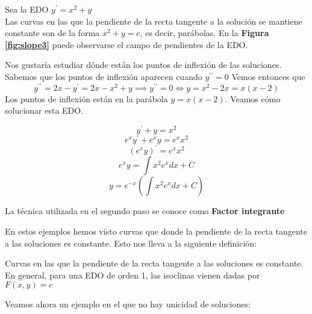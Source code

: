 \documentclass{mathnotes}
\begin{document}

\begin{example}
Sea la EDO $y^\prime = x^2+y$\\
Las curvas en las que la pendiente de la recta tangente a la solución se mantiene constante son de la forma $x^2+y=c$, es decir, parábolas. En la \textbf{Figura \ref{fig:slope3}} puede observarse el campo de pendientes de la EDO.

Nos gustaría estudiar dónde están los puntos de inflexión de las soluciones. Sabemos que los puntos de inflexión aparecen cuando $y^{\prime\prime} = 0$
Vemos entonces que
$$y^{\prime\prime} =  2x-y^\prime = 2x-x^2+y \implies y^{\prime\prime} = 0 \iff y = x^2-2x=x(x-2)$$
Los puntos de inflexión están en la parábola $y=x(x-2)$.
Veamos cómo solucionar esta EDO.

$$y^\prime + y = x^2$$
$$e^xy^\prime + e^xy = e^xx^2$$
$$(e^xy)^\prime = e^xx^2$$
$$e^xy = \int x^2e^xdx + C$$
$$y = e^{-x}(\int x^2e^xdx+C)$$

La técnica utilizada en el segundo paso se conoce como \textbf{Factor integrante}
\end{example}

En estos ejemplos hemos visto curvas que donde la pendiente de la recta tangente a las soluciones es constante. Esto nos lleva a la siguiente definición:

\begin{definition}
Curvas en las que la pendiente de la recta tangente a las soluciones es constante.
En general, para una EDO de orden 1, las isoclinas vienen dadas por $F(x,y) = c$
\end{definition}

Veamos ahora un ejemplo en el que no hay unicidad de soluciones:
\end{document}
